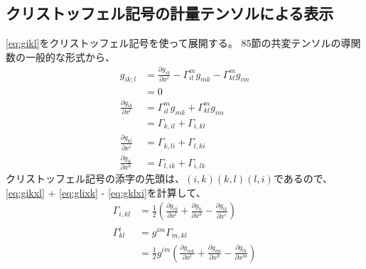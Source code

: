 \documentclass{jsarticle}
\begin{document}
\subsection{クリストッフェル記号の計量テンソルによる表示}
\eqref{eq:gikl}をクリストッフェル記号を使って展開する。
85節の共変テンソルの導関数の一般的な形式から、
\begin{align}
    g_{ik;l} &= \frac{\partial{g_{ik}}}{\partial{x^{l}}} - 
    \Gamma^{m}_{il} g_{mk} - \Gamma^{m}_{kl}g_{im}\\
    &= 0\\
    \frac{\partial{g_{ik}}}{\partial{x^{l}}} &= 
    \Gamma^{m}_{il} g_{mk} + \Gamma^{m}_{kl}g_{im}\\
    &= \Gamma_{k,il} + \Gamma_{i,kl}
    \label{eq:gikxl}\\
    \frac{\partial{g_{kl}}}{\partial{x^{i}}} 
    &= \Gamma_{k,li} + \Gamma_{l,ki}
    \label{eq:gklxi}\\
    \frac{\partial{g_{li}}}{\partial{x^{k}}} 
    &= \Gamma_{l,ik} + \Gamma_{i,lk}
    \label{eq:glixk}
\end{align}
クリストッフェル記号の添字の先頭は、$(i, k) (k, l) (l, i)$であるので、
\eqref{eq:gikxl} + \eqref{eq:glixk} - \eqref{eq:gklxi}を計算して、
\begin{align}
    \Gamma_{i,kl} &=
    \frac{1}{2}
    \left(
    \frac{\partial{g_{ik}}}{\partial{x^{l}}}
     +
    \frac{\partial{g_{li}}}{\partial{x^{k}}}
     -
    \frac{\partial{g_{lk}}}{\partial{x^{i}}}
    \right)
    \label{eq:gamma1}\\
    \Gamma^{i}_{kl} &= g^{im} \Gamma_{m,kl}\\
                    &=
    \frac{1}{2}g^{im} 
    \left(
    \frac{\partial{g_{mk}}}{\partial{x^{l}}}
     +
    \frac{\partial{g_{lm}}}{\partial{x^{k}}}
     -
    \frac{\partial{g_{lk}}}{\partial{x^{m}}}
    \right)
    \label{eq:gamma2}
\end{align}
\end{document}

